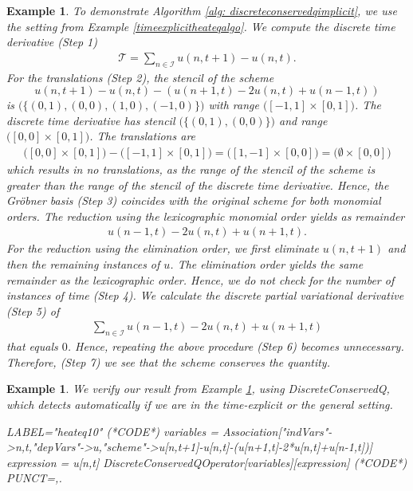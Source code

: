 \documentclass[manuscript]{acmart}
\newcommand{\1}{{\chi}}
\newcommand{\Ii}{{\mathcal{I}}}
\numberwithin{equation}{section}
\theoremstyle{thmlemcorr}
\numberwithin{theorem}{section}
\theoremstyle{thmlemcorr*}
\theoremstyle{defi}
\theoremstyle{remexample}
\newtheorem{example}[theorem]{Example}
\theoremstyle{ass}
\begin{document}
	\begin{example}
		\label{heateqalgoimplicit}
		To demonstrate Algorithm \ref{alg: discreteconservedqimplicit}, we use the setting from Example \ref{timeexplicitheateqalgo}.
		We compute the discrete time derivative (Step 1)
		\begin{gather*}
			\mathcal{T}=\sum_{n\in\Ii} u(n,t+1)-u(n,t).
		\end{gather*}
		For the translations (Step 2), the stencil of the scheme
		\begin{equation*}
			u(n,t+1)-u(n,t)-(u(n+1,t)-2u(n,t)+u(n-1,t))
		\end{equation*}
		\small
		is
		$
			\Big(\big\{(0,1),(0,0),(1,0),(-1,0)\big\}\Big)
		$
		\normalsize
	with range \small$\Big([-1,1]\times[0,1]\Big)$\normalsize.
	The discrete time derivative has stencil \small$\Big(\big\{(0,1),(0,0)\big\}\Big)$\normalsize 
	 and range \small$\Big([0,0]\times[0,1]\Big)$\normalsize.
	The translations are
	\small
	\begin{gather*}
	\Big([0,0]\times[0,1]\Big)-\Big([-1,1]\times[0,1]\Big)=\Big([1,-1]\times[0,0]\Big)=\Big(\emptyset\times[0,0]\Big)
	\end{gather*}
	\normalsize
	which results in no translations, as the range of the stencil of the scheme is greater than the range of the stencil of the discrete time derivative.
	Hence, the Gr{\"o}bner basis (Step 3) coincides with the original scheme for both monomial orders.
	The reduction using the lexicographic monomial order yields as remainder
	\begin{gather*}
		u(n-1,t)-2u(n,t)+u(n+1,t).
	\end{gather*}
	For the reduction using the elimination order, we first eliminate $u(n,t+1)$ and then the remaining instances of $u$.
	The elimination order yields the same remainder as the lexicographic order. Hence, we do not check for the number of instances of time (Step 4).
	We calculate the discrete partial variational derivative (Step 5) of
	\begin{gather*}
		\sum_{n\in\Ii}u(n-1,t)-2u(n,t)+u(n+1,t)
	\end{gather*}
	that equals $0$.
	Hence, repeating the above procedure (Step 6) becomes unnecessary.
	Therefore, (Step 7) we see that the scheme conserves the quantity.
	\end{example}
	\begin{example}
		We verify our result from Example \ref{heateqalgoimplicit}, using {\sc DiscreteConservedQ}, which detects automatically if we are in the time-explicit or the general setting.
		\begin{EXE}
		LABEL="heateq10"
		(*CODE*)
		variables = Association["indVars"->{n,t},"depVars"->{u},"scheme"->{u[n,t+1]-u[n,t]-(u[n+1,t]-2*u[n,t]+u[n-1,t])}]
		expression = u[n,t]
		DiscreteConservedQOperator[variables][expression]
		(*CODE*)
		PUNCT={,.}
		\end{EXE}
		\begin{small}
		
		
		\end{small}
	\end{example}
\end{document}
